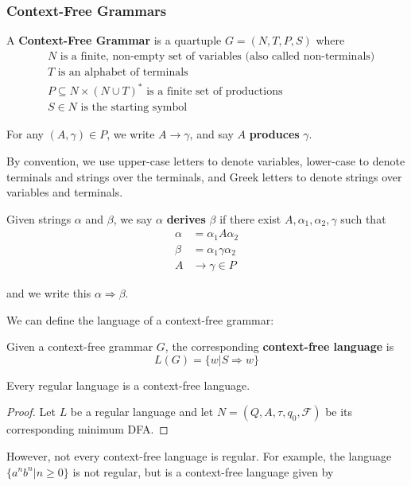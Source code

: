 \subsubsection{Context-Free Grammars}\label{subsec:context-free-grammars}
\begin{definition}
    A \textbf{Context-Free Grammar} is a quartuple \(G=(N, T, P, S)\) where 
          \begin{align*}
                & N\text{ is a finite, non-empty set of variables (also called non-terminals)}\\
                & T\text{ is an alphabet of terminals}\\
                & P\subseteq N\times{(N\cup T)}^*\text{ is a finite set of productions}\\
                & S\in N\text{ is the starting symbol}
          \end{align*}

          For any \((A, \gamma)\in P\), we write \(A\to\gamma \), and say \(A\) \textbf{produces} \(\gamma \). 
\end{definition}

By convention, we use upper-case letters to denote variables, lower-case to denote terminals and strings over the terminals, and Greek letters to denote strings over variables and terminals.

\begin{definition}
    Given strings \(\alpha \) and \(\beta \), we say \(\alpha \) \textbf{derives} \(\beta \) if there exist \(A, \alpha_1,\alpha_2,\gamma \) such that 
    \begin{align*}
          \alpha &= \alpha_1A\alpha_2\\
          \beta  &= \alpha_1\gamma\alpha_2\\
          A&\to \gamma\in P
    \end{align*}

    and we write this \(\alpha\Rightarrow\beta \). 
\end{definition}

We can define the language of a context-free grammar:

\begin{definition}
      Given a context-free grammar \(G\), the corresponding \textbf{context-free language} is \[L(G)=\{w|S\Rightarrow w\} \]
\end{definition}

\begin{theorem}
      Every regular language is a context-free language. 
\end{theorem}

\begin{proof}
      Let \(L\) be a regular language and let \(N=(Q, A, \tau, q_0, \mathcal{F})\) be its corresponding minimum DFA. 
\end{proof}

However, not every context-free language is regular. For example, the language \( \{a^n b^n|n\geq0\} \) is not regular, but is a context-free language given by